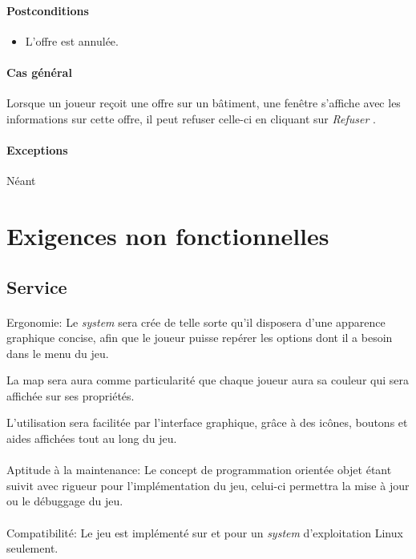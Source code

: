\documentclass[a4paper,11pt]{report}
\begin{document}
\paragraph{Postconditions}
\begin{itemize}
 \item L'offre est annulée.
\end{itemize}
\paragraph{Cas général}
Lorsque un joueur reçoit une offre sur un bâtiment, une fenêtre s'affiche avec les informations sur cette offre, il peut refuser celle-ci en cliquant sur \og \textit{Refuser} \fg.
\paragraph{Exceptions} Néant

\newpage
\section{Exigences non fonctionnelles}
\subsection{Service}
\paragraph{}Ergonomie:  \newline
Le \textit{system} sera crée de telle sorte qu'il disposera d’une apparence graphique concise, afin que le joueur puisse repérer les options dont il a besoin dans le menu du jeu.

La map sera aura comme particularité que chaque joueur aura sa couleur qui sera affichée sur ses propriétés.

L'utilisation sera facilitée par l'interface graphique, grâce à des icônes, boutons et aides affichées tout au long du jeu.

\paragraph{}Aptitude à la maintenance:  \newline
Le concept de programmation orientée objet étant suivit avec rigueur pour l’implémentation du jeu, celui-ci permettra la mise à jour ou le débuggage du jeu.

\paragraph{}Compatibilité:  \newline
Le jeu est implémenté sur et pour un \textit{system} d'exploitation Linux seulement.
\end{document}
